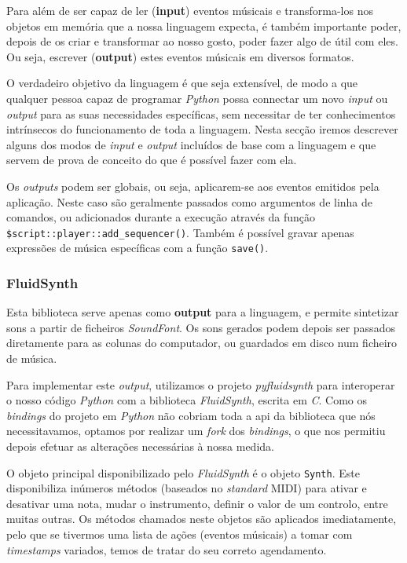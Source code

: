 Para além de ser capaz de ler (\textbf{input}) eventos músicais e transforma-los nos objetos em memória que a nossa linguagem expecta, é também importante poder, depois de os criar e transformar ao nosso gosto, poder fazer algo de útil com eles. Ou seja, escrever (\textbf{output}) estes eventos músicais em diversos formatos.

O verdadeiro objetivo da linguagem é que seja extensível, de modo a que qualquer pessoa capaz de programar \textit{Python} possa connectar um novo \textit{input} ou \textit{output} para as suas necessidades específicas, sem necessitar de ter conhecimentos intrínsecos do funcionamento de toda a linguagem. Nesta secção iremos descrever alguns dos modos de \textit{input} e \textit{output} incluídos de base com a linguagem e que servem de prova de conceito do que é possível fazer com ela.

Os \textit{outputs} podem ser globais, ou seja, aplicarem-se aos eventos emitidos pela aplicação. Neste caso são geralmente passados como argumentos de linha de comandos, ou adicionados durante a execução através da função \texttt{\$script::player::add\_sequencer()}. Também é possível gravar apenas expressões de música específicas com a função \texttt{save()}.
\subsubsection{FluidSynth}
Esta biblioteca serve apenas como \textbf{output} para a linguagem, e permite sintetizar sons a partir de ficheiros \textit{SoundFont}. Os sons gerados podem depois ser passados diretamente para as colunas do computador, ou guardados em disco num ficheiro de música.

Para implementar este \textit{output}, utilizamos o projeto \textit{pyfluidsynth}\cite{pyfluidsynth} para interoperar o nosso código \textit{Python} com a biblioteca \textit{FluidSynth}, escrita em \textit{C}. Como os \textit{bindings} do projeto em \textit{Python} não cobriam toda a \acrshort{api} da biblioteca que nós necessitavamos, optamos por realizar um \textit{fork} dos \textit{bindings}, o que nos permitiu depois efetuar as alterações necessárias à nossa medida.

O objeto principal disponibilizado pelo \textit{FluidSynth} é o objeto \texttt{Synth}. Este disponibiliza inúmeros métodos (baseados no \textit{standard} MIDI) para ativar e desativar uma nota, mudar o instrumento, definir o valor de um controlo, entre muitas outras. Os métodos chamados neste objetos são aplicados imediatamente, pelo que se tivermos uma lista de ações (eventos músicais) a tomar com \textit{timestamps} variados, temos de tratar do seu correto agendamento.

